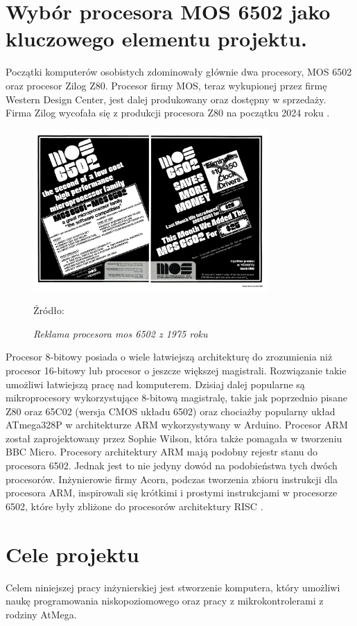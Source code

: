 \null\newpage
\section{Wybór procesora MOS 6502 jako kluczowego elementu projektu.}

Początki komputerów osobistych zdominowały głównie dwa procesory, MOS 6502 oraz procesor Zilog Z80. Procesor firmy MOS, teraz wykupionej przez firmę Western Design Center, jest dalej produkowany oraz dostępny w sprzedaży. Firma Zilog wycofała się z produkcji procesora Z80 na początku 2024 roku \parencite{ithardware2024}. 

\begin{figure}[h]
    \centering
    \includegraphics[width=0.8\textwidth]{images/MOS_6501_6502_Ad_Sept_1975.jpg} %
    \caption{ \textit{Reklama procesora mos 6502 z 1975 roku}}
    \label{fig:apple1} 
    \vspace{0.5em} %
    \footnotesize Źródło: \parencite{wikipedia6502}
\end{figure}

Procesor 8-bitowy posiada o wiele łatwiejszą architekturę do zrozumienia niż procesor 16-bitowy lub procesor o jeszcze większej magistrali. Rozwiązanie takie umożliwi łatwiejszą pracę nad komputerem. Dzisiaj dalej popularne są mikroprocesory wykorzystujące 8-bitową magistralę, takie jak poprzednio pisane Z80 oraz 65C02 (wersja CMOS układu 6502) oraz chociażby popularny układ ATmega328P w architekturze ARM wykorzystywany w Arduino. Procesor ARM został zaprojektowany przez Sophie Wilson, która także pomagała w tworzeniu BBC Micro. Procesory architektury ARM mają podobny rejestr stanu do procesora 6502. Jednak jest to nie jedyny dowód na podobieństwa tych dwóch procesorów. Inżynierowie firmy Acorn, podczas tworzenia zbioru instrukcji dla procesora ARM\parencite{statusregisterARm}, inspirowali się krótkimi i prostymi instrukcjami w procesorze 6502, które były zbliżone do procesorów architektury RISC \parencite{atack1993}.

\null\newpage
\section{Cele projektu}
Celem niniejszej pracy inżynierskiej jest stworzenie komputera, który umożliwi naukę programowania niskopoziomowego oraz pracy z mikrokontrolerami z rodziny AtMega.

\endgroup